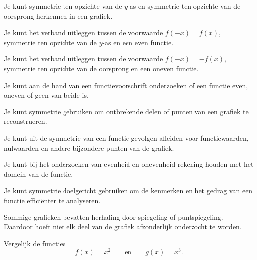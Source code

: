 \documentclass{ximera}
\begin{document}
  \begin{leerdoelen}
  
    \item Je kunt symmetrie ten opzichte van de \(y\)-as en symmetrie ten opzichte van de oorsprong herkennen in een grafiek.
  
    \item Je kunt het verband uitleggen tussen de voorwaarde \(f(-x)=f(x)\), symmetrie ten opzichte van de \(y\)-as en een even functie.
  
    \item Je kunt het verband uitleggen tussen de voorwaarde \(f(-x)=-f(x)\), symmetrie ten opzichte van de oorsprong en een oneven functie.
  
    \item Je kunt aan de hand van een functievoorschrift onderzoeken of een functie even, oneven of geen van beide is.
  
    \item Je kunt symmetrie gebruiken om ontbrekende delen of punten van een grafiek te reconstrueren.
  
    \item Je kunt uit de symmetrie van een functie gevolgen afleiden voor functiewaarden, nulwaarden en andere bijzondere punten van de grafiek.
  
    \item Je kunt bij het onderzoeken van evenheid en onevenheid rekening houden met het domein van de functie.
  
    \item Je kunt symmetrie doelgericht gebruiken om de kenmerken en het gedrag van een functie efficiënter te analyseren.
  
  \end{leerdoelen}


Sommige grafieken bevatten herhaling door spiegeling of puntspiegeling.
Daardoor hoeft niet elk deel van de grafiek afzonderlijk onderzocht te worden.

Vergelijk de functies
\[
f(x)=x^2
\qquad\text{en}\qquad
g(x)=x^3.
\]

\begin{center}
\end{center}
\end{document}
